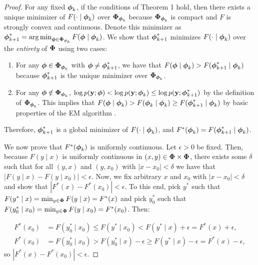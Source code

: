 \begin{proof}
    For any fixed $\boldsymbol{\phi}_k$, if the conditions of Theorem 1 hold, then there exists a unique minimizer of $F(\cdot \mid \boldsymbol{\phi}_k)$ over $\boldsymbol{\Phi}_{\boldsymbol{\phi}_{k}}$ because $\boldsymbol{\Phi}_{\boldsymbol{\phi}_{k}}$ is compact and $F$ is strongly convex and continuous. Denote this minimizer as $\boldsymbol{\phi}_{k+1}^* = \operatorname*{arg\,min}_{\boldsymbol{\phi} \in \boldsymbol{\Phi}_{\boldsymbol{\phi}_{k}}} F(\boldsymbol{\phi} \mid \boldsymbol{\phi}_{k})$. We show that $\boldsymbol{\phi}_{k+1}^*$ minimizes $F(\cdot \mid \boldsymbol{\phi}_{k})$ over the \textit{entirety} of $\boldsymbol{\Phi}$ using two cases:
    
    \begin{enumerate}
        \item For any $\boldsymbol{\phi} \in \boldsymbol{\Phi}_{\boldsymbol{\phi}_{k}}$ with $\boldsymbol{\phi} \neq \boldsymbol{\phi}_{k+1}^*$, we have that $F(\boldsymbol{\phi} \mid \boldsymbol{\phi}_{k}) > F(\boldsymbol{\phi}_{k+1}^* \mid \boldsymbol{\phi}_{k})$ because $\boldsymbol{\phi}_{k+1}^*$ is the unique minimizer over $\boldsymbol{\Phi}_{\boldsymbol{\phi}_{k}}$. 
        \item For any $\boldsymbol{\phi} \notin \boldsymbol{\Phi}_{\boldsymbol{\phi}_{k}}$, $\log p(\mathbf{y};\boldsymbol{\phi}) < \log p(\mathbf{y};\boldsymbol{\phi}_k) \leq \log p(\mathbf{y};\boldsymbol{\phi}^*_{k+1})$ by the definition of $\boldsymbol{\Phi}_{\boldsymbol{\phi}_{k}}$. This implies that $F(\boldsymbol{\phi} \mid \boldsymbol{\phi}_{k}) > F(\boldsymbol{\phi}_{k} \mid \boldsymbol{\phi}_{k}) \geq F(\boldsymbol{\phi}^*_{k+1} \mid \boldsymbol{\phi}_{k})$ by basic properties of the EM algorithm \citep{Dempster:1977}.
    \end{enumerate} 

    Therefore, $\boldsymbol{\phi}_{k+1}^*$ is a global minimizer of $F(\cdot \mid \boldsymbol{\phi}_k)$, and $F^{*}(\boldsymbol{\phi}_{k}) = F(\boldsymbol{\phi}_{k+1}^* \mid \boldsymbol{\phi}_k)$.

    We now prove that $F^*(\boldsymbol{\phi}_k)$ is uniformly continuous. Let $\epsilon > 0$ be fixed. Then, because $F(y \mid x)$ is uniformly continuous in $(x,y) \in \boldsymbol{\Phi} \times \boldsymbol{\Phi}$, there exists some $\delta$ such that for all $(y,x)$ and $(y,x_0)$ with $|x-x_0| < \delta$ we have that $|F(y \mid x) - F(y \mid x_0)| < \epsilon$. Now, we fix arbitrary $x$ and $x_0$ with $|x-x_0| < \delta$ and show that $|F^*(x) - F^*(x_0)| < \epsilon$. To this end, pick $y^*$ such that $F(y^* \mid x) = \min_{y \in \boldsymbol{\Phi}} F(y \mid x)= F^*(x)$ and pick $y_0^*$ such that $F(y_0^* \mid x_0) = \min_{y \in \boldsymbol{\Phi}} F(y \mid x_0) = F^*(x_0)$. Then: 
    
    \begin{align*}
        F^*(x_0) &= F(y_0^* \mid x_0) \leq F(y^* \mid x_0) < F(y^* \mid x) + \epsilon = F^*(x) + \epsilon, \\ 
        F^*(x_0) &= F(y_0^* \mid x_0) > F(y_0^* \mid x) - \epsilon \geq F(y^* \mid x) - \epsilon = F^*(x) - \epsilon,
    \end{align*}
    so $|F^*(x) - F^*(x_0)| < \epsilon$.
\end{proof}

